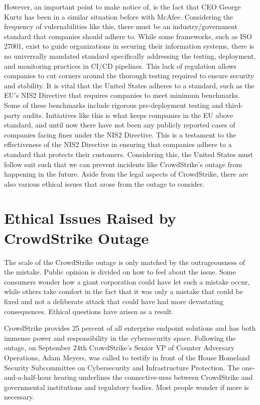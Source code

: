 However, an important point to make notice of, is the fact that CEO George Kurtz has been in a similar situation before with McAfee. Considering the frequency of
vulernabilities like this, there must be an industry/government standard that companies should adhere to.  While some frameworks, such as ISO 27001, exist to guide organizations in securing their information systems,
there is no universally mandated standard specifically addressing the testing, deployment, and monitoring practices in CI/CD pipelines. This lack of regulation allows companies to cut corners around the thorough testing required to ensure security and stability.
It is vital that the United States adheres to a standard, such as the EU's NIS2 Directive that requires companies to meet minimum benchmarks.
Some of these benchmarks include rigorous pre-deployment testing and third-party audits. \cite{eu_nis2} Initiatives like this is what keeps companies in the EU above standard,
and until now there have not been any publicly reported cases of companies facing fines under the NIS2 Directive. This is a testament to the effectiveness of the NIS2 Directive in ensuring that companies adhere to a standard that protects their customers.
Considering this, the United States must follow suit such that we can prevent incidents like CrowdStrike's outage from happening in the future. Aside from the legal aspects of CrowdStrike, there are also various ethical issues that arose from the outage to consider. 

\section{Ethical Issues Raised by CrowdStrike Outage}

The scale of the CrowdStrike outage is only matched by the outrageousness of the mistake. Public opinion is divided on how to feel about the issue. Some consumers wonder how a giant corporation could have let such a mistake occur, while others take comfort in the fact that it was only a mistake that could be fixed and not a deliberate attack that could have had more devastating consequences.  Ethical questions have arisen as a result.

CrowdStrike provides 25 percent of all enterprise endpoint solutions and has both immense power and responsibility in the cybersecurity space. Following the outage, on September 24th CrowdStrike’s Senior VP of Counter Adversary Operations, Adam Meyers, was called to testify in front of the House Homeland Security Subcommittee on Cybersecurity and Infrastructure Protection. The one-and-a-half-hour hearing underlines the connective-ness between CrowdStrike and governmental institutions and regulatory bodies. Most people wonder if more is necessary.  

